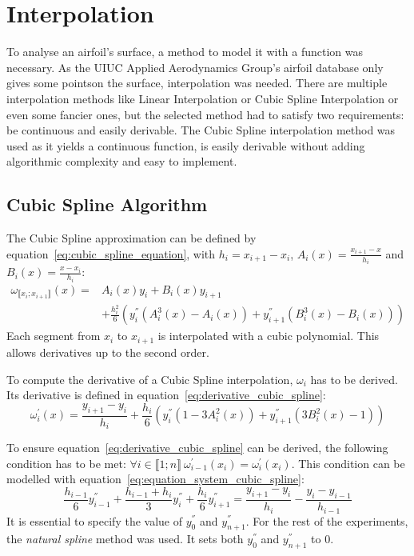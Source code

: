 \section{Interpolation}

To analyse an airfoil's surface, a method to model it
with a function was necessary. As the UIUC Applied Aerodynamics Group's airfoil database only gives some pointson the surface, interpolation was needed. There are multiple interpolation
methods like Linear Interpolation or Cubic Spline Interpolation or even some fancier ones, but the selected method had to satisfy two requirements: be continuous and easily derivable.
The Cubic Spline interpolation method was used as it yields a continuous function, is easily derivable without adding algorithmic complexity and 
easy to implement.

\subsection{Cubic Spline Algorithm} \label{Cubic Spline algorithm}
The Cubic Spline approximation can be defined by equation~\ref{eq:cubic_spline_equation},
with $h_i = x_{i+1} - x_i$, $A_i(x) = \frac{x_{i+1}-x}{h_i}$ and $B_i(x) = \frac{x-x_i}{h_i}$:
\begin{equation}
	\label{eq:cubic_spline_equation}
	\begin{split}
		\omega_{\llbracket x_i;x_{i+1} \rrbracket}(x) = &A_i(x)y_i+B_i(x)y_{i+1} \\
		& + \frac{h_i^2}{6}\left(y_i^{''}\left(A_i^3(x) - A_i(x)\right)
		+ y_{i+1}^{''}\left(B_i^3(x) - B_i(x)\right)\right)
	\end{split}
\end{equation}
Each segment from $x_{i}$ to $x_{i+1}$ is interpolated with a cubic polynomial. This allows derivatives up to the second order.

To compute the derivative of a Cubic Spline interpolation, $\omega_i$ has to be derived. Its derivative is defined in equation~\ref{eq:derivative_cubic_spline}:
\begin{equation}
	\label{eq:derivative_cubic_spline}
	\omega_i^{'}(x) = \frac{y_{i+1} - y_i}{h_i} 
		+ \frac{h_i}{6}\left(
			y_i^{''}\left(1-3A_i^2(x)\right)
			+ y_{i+1}^{''}\left(3B_i^2(x)-1\right)
		\right)
\end{equation}

To ensure equation~\ref{eq:derivative_cubic_spline} can be derived, the following condition has to be met: $\forall i \in \llbracket 1;n \rrbracket~\omega_{i-1}^{'}(x_i) = \omega_i^{'}(x_i)$.
This condition can be modelled with equation~\ref{eq:equation_system_cubic_spline}:
\begin{equation}
	\label{eq:equation_system_cubic_spline}
	\frac{h_{i-1}}{6}y_{i-1}^{''} + \frac{h_{i-1} + h_i}{3}y_i^{''} + \frac{h_i}{6}y_{i+1}^{''}
	= \frac{y_{i+1}-y_i}{h_i}-\frac{y_i-y_{i-1}}{h_{i-1}}
\end{equation}
It is essential to specify the value of $y_0^{''}$ and $y_{n+1}^{''}$. For the rest of the experiments, the \textit{natural spline} method was used. It sets both $y_0^{''}$ and $y_{n+1}^{''}$ to $0$.

